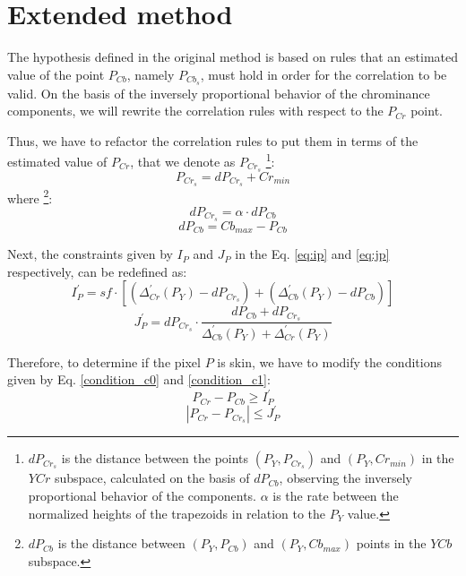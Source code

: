 \section{Extended method}
\label{sec:proposed_method}

The hypothesis defined in the original method is based on rules that an estimated value of the point $P_{Cb}$, namely $P_{Cb_s}$, must hold in order for the correlation to be valid. On the basis of the inversely proportional behavior of the chrominance components, we will rewrite the correlation rules with respect to the $P_{Cr}$ point.

Thus, we have to refactor the correlation rules to put them in terms of the estimated value of $P_{Cr}$, that we denote as $P_{Cr_s}$ \footnote{$dP_{Cr_s}$ is the distance between the points $(P_Y, P_{Cr_s})$ and $(P_Y, Cr_{min})$ in the $YCr$ subspace, calculated on the basis of $dP_{Cb}$, observing the inversely proportional behavior of the components. $\alpha$ is the rate between the normalized heights of the trapezoids in relation to the $P_Y$ value.}:
\begin{equation}
    P_{Cr_s} = dP_{Cr_s} + Cr_{min}
\end{equation}
where \footnote{$dP_{Cb}$ is the distance between $(P_Y, P_{Cb})$ and $(P_Y, Cb_{max})$ points in the $YCb$ subspace.}:
\begin{equation}
    dP_{Cr_s} = \alpha \cdot dP_{Cb}
\end{equation}
\begin{equation}
    dP_{Cb}   = Cb_{max} - P_{Cb}
\end{equation}

Next, the constraints given by $I_P$ and $J_P$ in the Eq. \ref{eq:ip} and \ref{eq:jp} respectively, can be redefined as:
\begin{equation}
    I^{'}_P = sf \cdot [(\Delta^{'}_{Cr}(P_Y) - dP_{Cr_s}) + (\Delta^{'}_{Cb}(P_Y) - dP_{Cb})]
\end{equation}
\begin{equation}
    J^{'}_P = dP_{Cr_s} \cdot \frac{dP_{Cb} + dP_{Cr_s}} {\Delta^{'}_{Cb}(P_Y) + \Delta^{'}_{Cr}(P_Y)}
\end{equation}

Therefore, to determine if the pixel $P$ is skin, we have to modify the conditions given by Eq. \ref{condition_c0} and \ref{condition_c1}:
\begin{equation}
    P_{Cr} - P_{Cb} \geq I^{'}_P
\label{condition_c00}
\end{equation}
\begin{equation}
   |P_{Cr} - P_{Cr_s}| \leq J^{'}_P
\label{condition_c11}
\end{equation}

